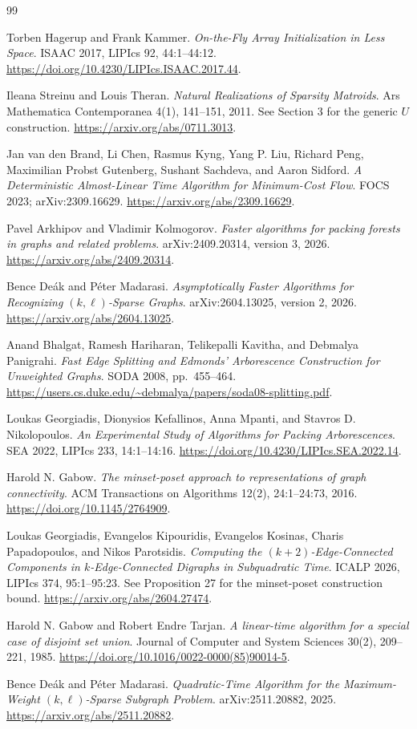 \documentclass[11pt,a4paper]{article}
\theoremstyle{definition}
\theoremstyle{remark}
\begin{document}
\begin{thebibliography}{99}
\raggedright

Torben Hagerup and Frank Kammer.
\emph{On-the-Fly Array Initialization in Less Space}.
ISAAC 2017, LIPIcs 92, 44:1--44:12.
\url{https://doi.org/10.4230/LIPIcs.ISAAC.2017.44}.

Ileana Streinu and Louis Theran.
\emph{Natural Realizations of Sparsity Matroids}.
Ars Mathematica Contemporanea 4(1), 141--151, 2011.
See Section 3 for the generic $U$ construction.
\url{https://arxiv.org/abs/0711.3013}.

Jan van den Brand, Li Chen, Rasmus Kyng, Yang P. Liu,
Richard Peng, Maximilian Probst Gutenberg, Sushant Sachdeva,
and Aaron Sidford.
\emph{A Deterministic Almost-Linear Time Algorithm
for Minimum-Cost Flow}.
FOCS 2023; arXiv:2309.16629.
\url{https://arxiv.org/abs/2309.16629}.

Pavel Arkhipov and Vladimir Kolmogorov.
\emph{Faster algorithms for packing forests in graphs
and related problems}.
arXiv:2409.20314, version 3, 2026.
\url{https://arxiv.org/abs/2409.20314}.

Bence Deák and Péter Madarasi.
\emph{Asymptotically Faster Algorithms for Recognizing
$(k,\ell)$-Sparse Graphs}.
arXiv:2604.13025, version 2, 2026.
\url{https://arxiv.org/abs/2604.13025}.

Anand Bhalgat, Ramesh Hariharan, Telikepalli Kavitha,
and Debmalya Panigrahi.
\emph{Fast Edge Splitting and Edmonds' Arborescence
Construction for Unweighted Graphs}.
SODA 2008, pp.\ 455--464.
\url{https://users.cs.duke.edu/~debmalya/papers/soda08-splitting.pdf}.

Loukas Georgiadis, Dionysios Kefallinos, Anna Mpanti,
and Stavros D. Nikolopoulos.
\emph{An Experimental Study of Algorithms for Packing
Arborescences}.
SEA 2022, LIPIcs 233, 14:1--14:16.
\url{https://doi.org/10.4230/LIPIcs.SEA.2022.14}.

Harold N. Gabow.
\emph{The minset-poset approach to representations
of graph connectivity}.
ACM Transactions on Algorithms 12(2), 24:1--24:73, 2016.
\url{https://doi.org/10.1145/2764909}.

Loukas Georgiadis, Evangelos Kipouridis, Evangelos Kosinas,
Charis Papadopoulos, and Nikos Parotsidis.
\emph{Computing the $(k+2)$-Edge-Connected Components in
$k$-Edge-Connected Digraphs in Subquadratic Time}.
ICALP 2026, LIPIcs 374, 95:1--95:23.
See Proposition 27 for the minset-poset construction bound.
\url{https://arxiv.org/abs/2604.27474}.

Harold N. Gabow and Robert Endre Tarjan.
\emph{A linear-time algorithm for a special case
of disjoint set union}.
Journal of Computer and System Sciences 30(2),
209--221, 1985.
\url{https://doi.org/10.1016/0022-0000(85)90014-5}.

Bence Deák and Péter Madarasi.
\emph{Quadratic-Time Algorithm for the Maximum-Weight
$(k,\ell)$-Sparse Subgraph Problem}.
arXiv:2511.20882, 2025.
\url{https://arxiv.org/abs/2511.20882}.

\end{thebibliography}
\end{document}
